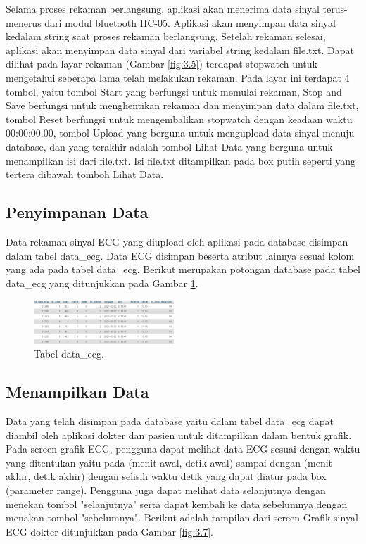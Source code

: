 \documentclass[conference]{IEEEtran}
\begin{document}
	Selama proses rekaman berlangsung, aplikasi akan menerima data sinyal terus-menerus dari modul bluetooth HC-05. Aplikasi akan menyimpan data sinyal kedalam string saat proses rekaman berlangsung. Setelah rekaman selesai, aplikasi akan menyimpan data sinyal dari variabel string kedalam file.txt. Dapat dilihat pada layar rekaman (Gambar \ref{fig:3.5}) terdapat stopwatch untuk mengetahui seberapa lama telah melakukan rekaman. Pada layar ini terdapat 4 tombol, yaitu tombol Start yang berfungsi untuk memulai rekaman, Stop and Save berfungsi untuk menghentikan rekaman dan menyimpan data dalam file.txt, tombol Reset berfungsi untuk mengembalikan stopwatch dengan keadaan waktu 00:00:00.00, tombol Upload yang berguna untuk mengupload data sinyal menuju database, dan yang terakhir adalah tombol Lihat Data yang berguna untuk menampilkan isi dari file.txt. Isi file.txt ditampilkan pada box putih seperti yang tertera dibawah tomboh Lihat Data.
	
	\vspace{1ex} 
	\subsection{Penyimpanan Data}
	\vspace{1ex}
	Data rekaman sinyal  ECG yang diupload oleh aplikasi pada database disimpan dalam tabel data\_ecg. Data ECG disimpan beserta atribut lainnya sesuai kolom yang ada pada tabel data\_ecg. 
	Berikut merupakan potongan database pada tabel data\_ecg yang ditunjukkan pada Gambar  \ref{fig:3.6}.
	
	\begin{figure}[h] \centering
		\includegraphics[width=0.47\textwidth]{img/tabel data ecg.png}
		\caption{Tabel data\_ecg.}
		\label{fig:3.6}
	\end{figure}
	
	\vspace{1ex} 
	\subsection{Menampilkan Data}
	\vspace{1ex}
	
	Data yang telah disimpan pada database yaitu dalam tabel data\_ecg dapat diambil oleh aplikasi dokter dan pasien untuk ditampilkan dalam bentuk grafik. Pada screen grafik ECG, pengguna dapat melihat data ECG sesuai dengan waktu yang ditentukan yaitu pada (menit awal, detik awal) sampai dengan (menit akhir, detik akhir) dengan selisih waktu detik yang dapat diatur pada box (parameter range). Pengguna juga dapat melihat data selanjutnya dengan menekan tombol "selanjutnya" serta dapat kembali ke data sebelumnya dengan menakan tombol "sebelumnya". Berikut adalah tampilan dari screen Grafik sinyal ECG dokter ditunjukkan pada Gambar \ref{fig:3.7}. 
	
\end{document}
